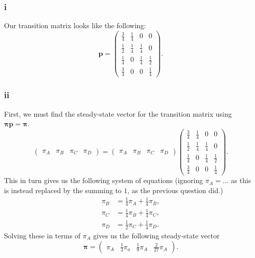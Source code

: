 \documentclass{article}
\begin{document}
\subsubsection{i}
Our transition matrix looks like the following:
\begin{equation}
    \mathbf{p} = \begin{pmatrix}
        \frac{3}{4} & \frac{1}{4} & 0 & 0 \\
        \frac{1}{2} & \frac{1}{4} & \frac{1}{4} & 0 \\
        \frac{1}{4} & 0 & \frac{1}{4} & \frac{1}{2} \\
        \frac{3}{4} & 0 & 0 & \frac{1}{4}
    \end{pmatrix}.
\end{equation}

\subsubsection{ii}
First, we must find the steady-state vector for the transition matrix using $\boldsymbol{\pi}\mathbf{p} = \boldsymbol{\pi}$.
\begin{equation}
    \begin{pmatrix}
        \pi_A & \pi_B & \pi_C & \pi_D
    \end{pmatrix} = \begin{pmatrix}
        \pi_A & \pi_B & \pi_C & \pi_D
    \end{pmatrix}\begin{pmatrix}
        \frac{3}{4} & \frac{1}{4} & 0 & 0 \\
        \frac{1}{2} & \frac{1}{4} & \frac{1}{4} & 0 \\
        \frac{1}{4} & 0 & \frac{1}{4} & \frac{1}{2} \\
        \frac{3}{4} & 0 & 0 & \frac{1}{4}
    \end{pmatrix}.
\end{equation}
This in turn gives us the following system of equations (ignoring $\pi_A=\ldots$ as this is instead replaced by the summing to $1$, as the previous question did.)
\begin{align}
    \pi_B &= \frac{1}{4}\pi_A + \frac{1}{4}\pi_B, \\
    \pi_C &= \frac{1}{4}\pi_B + \frac{1}{4}\pi_C, \\
    \pi_D &= \frac{1}{2}\pi_C + \frac{1}{4}\pi_D.
\end{align}
Solving these in terms of $\pi_A$ gives us the following steady-state vector
\begin{equation}
    \boldsymbol{\pi} = \begin{pmatrix}
        \pi_A & \frac{1}{3}\pi_a & \frac{1}{9}\pi_A & \frac{2}{27}\pi_A
    \end{pmatrix}.
\end{equation}
\end{document}
